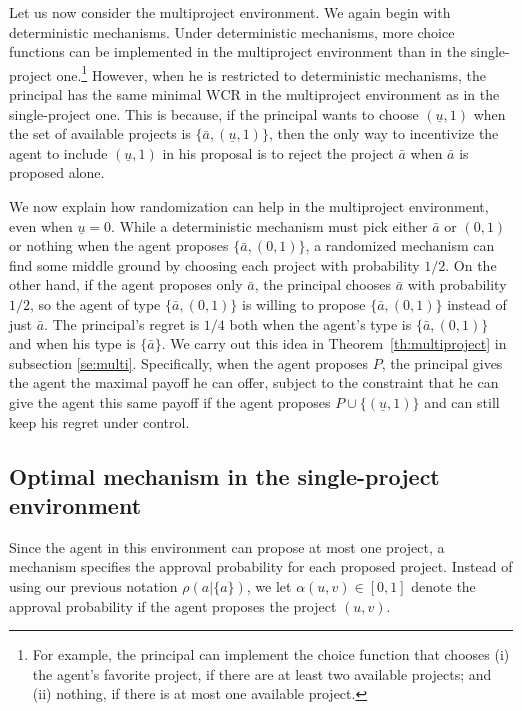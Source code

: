 \documentclass[12pt,english]{article}
\newcommand{\underu}{{\underline{u}}}
\theoremstyle{remark}
\theoremstyle{plain}
\theoremstyle{definition}
\newcommand{\wcr}{\mathrm{WCR}}
\begin{document}
Let us now consider the multiproject environment. We again begin with deterministic mechanisms. Under deterministic mechanisms, more choice functions can be implemented in the multiproject environment than in the single-project one.\footnote{For example, the principal can implement the choice function that chooses (i) the agent's favorite project, if there are at least two available projects; and (ii) nothing, if there is at most one available project.} However, when he is restricted to deterministic mechanisms, the principal has the same minimal $\wcr$ in the multiproject environment as in the single-project one. This is because, if the principal wants to choose $(\underu, 1)$ when the set of available projects is $\{\bar{a},(\underu,1)\}$, then the only way to incentivize the agent to include $(\underu,1)$ in his proposal is to reject the project $\bar{a}$ when $\bar{a}$ is proposed alone. 


We now explain how randomization can help in the multiproject environment, even when $\underu=0$. While a deterministic mechanism must pick either $\bar{a}$ or $(0,1)$ or nothing when the agent proposes $\{\bar{a}, (0,1)\}$, a randomized mechanism can find some middle ground by choosing each project with probability $1/2$. On the other hand, if the agent proposes only $\bar{a}$, the principal chooses $\bar{a}$ with probability $1/2$, so the agent of type $\{\bar{a}, (0,1)\}$ is willing to propose $\{\bar{a}, (0,1)\}$ instead of just $\bar{a}$. The principal's regret is $1/4$ both when the agent's type is $\{\bar{a}, (0,1)\}$ and when his type is $\{\bar{a}\}$. We carry out this idea in Theorem~\ref{th:multiproject} in subsection \ref{se:multi}. Specifically, when the agent proposes $P$, the principal gives the agent the maximal payoff he can offer, subject to the constraint that he can give the agent this same payoff if the agent proposes $P\cup\{(\underu, 1)\}$ and can still keep his regret under control.

\subsection{Optimal mechanism in the single-project environment} \label{se:single}


Since the agent in this environment can propose at most one project, a mechanism specifies the approval probability for each proposed project. Instead of using our previous notation $\rho(a|\{a\})$, we let $\alpha(u,v) \in [0,1]$ denote the approval probability if the agent proposes the project $(u,v)$. 
\end{document}
